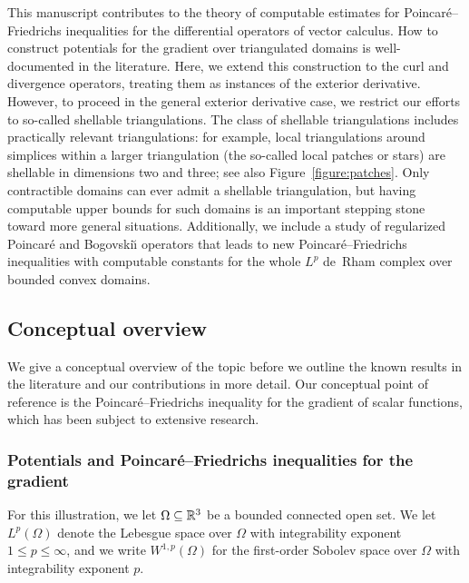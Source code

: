 \documentclass[10pt,a4paper]{article}
\begin{document}
This manuscript contributes to the theory of computable estimates for Poincar\'e--Friedrichs inequalities for the differential operators of vector calculus.
How to construct potentials for the gradient over triangulated domains is well-documented in the literature.
Here, we extend this construction to the curl and divergence operators, treating them as instances of the exterior derivative.
However, to proceed in the general exterior derivative case, we restrict our efforts to so-called shellable triangulations.
The class of shellable triangulations includes practically relevant triangulations:
for example, local triangulations around simplices within a larger triangulation (the so-called local patches or stars) are shellable in dimensions two and three; see also Figure~\ref{figure:patches}.
Only contractible domains can ever admit a shellable triangulation, but having computable upper bounds for such domains is an important stepping stone toward more general situations.
Additionally, we include a study of regularized Poincar\'e and Bogovski\u{\i} operators that leads to new Poincar\'e--Friedrichs inequalities with computable constants for the whole $L^{p}$ de~Rham complex over bounded convex domains.




\subsection{Conceptual overview}

We give a conceptual overview of the topic before we outline the known results in the literature and our contributions in more detail. 
Our conceptual point of reference is the Poincar\'e--Friedrichs inequality for the gradient of scalar functions, which has been subject to extensive research.


\subsubsection{Potentials and Poincar\'e--Friedrichs inequalities for the gradient}

For this illustration, we let $\Omega \subseteq {\mathbb R}^3$ be a bounded connected open set. 
We let $L^{p}(\Omega)$ denote the Lebesgue space over $\Omega$ with integrability exponent $1 \leq p \leq \infty$, 
and we write $W^{1,p}(\Omega)$ for the first-order Sobolev space over $\Omega$ with integrability exponent $p$. 
\end{document}
